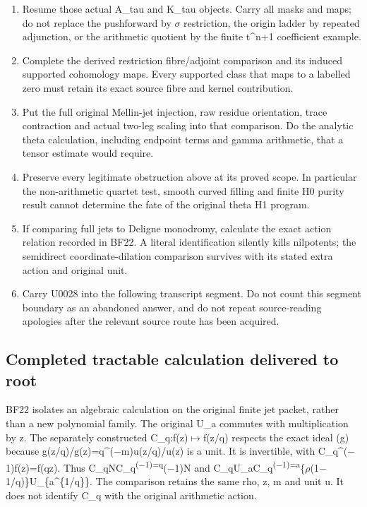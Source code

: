 \begin{enumerate}
\def\labelenumi{\arabic{enumi}.}
\tightlist
\item
  Resume those actual A\_tau and K\_tau objects. Carry all masks and
  maps; do not replace the pushforward by
  \allowbreak{}\ensuremath{σ}\allowbreak{} restriction, the origin
  ladder by repeated adjunction, or the arithmetic quotient by the
  finite t\^{}n+1 coefficient example.
\item
  Complete the derived restriction fibre/adjoint comparison and its
  induced supported cohomology maps. Every supported class that maps to
  a labelled zero must retain its exact source fibre and kernel
  contribution.
\item
  Put the full original Mellin-jet injection, raw residue orientation,
  trace contraction and actual two-leg scaling into that comparison. Do
  the analytic theta calculation, including endpoint terms and gamma
  arithmetic, that a tensor estimate would require.
\item
  Preserve every legitimate obstruction above at its proved scope. In
  particular the non-arithmetic quartet test, smooth curved filling and
  finite H0 purity result cannot determine the fate of the original
  theta H1 program.
\item
  If comparing full jets to Deligne monodromy, calculate the exact
  action relation recorded in BF22. A literal identification silently
  kills nilpotents; the semidirect coordinate-dilation comparison
  survives with its stated extra action and original unit.
\item
  Carry U0028 into the following transcript segment. Do not count this
  segment boundary as an abandoned answer, and do not repeat
  source-reading apologies after the relevant source route has been
  acquired.
\end{enumerate}

\subsection{Completed tractable calculation delivered to
root}\label{TranscriptLedgerStage:completed-tractable-calculation-delivered-to-root}

BF22 isolates an algebraic calculation on the original finite jet
packet, rather than a new polynomial family. The original U\_a commutes
with multiplication by z. The separately constructed
C\_q:f(z)\allowbreak{}\ensuremath{↦}\allowbreak{}f(z/q) respects the
exact ideal (g) because
g(z/q)/g(z)=q\textasciicircum{}(\allowbreak{}\ensuremath{−}\allowbreak{}m)u(z/q)/u(z)
is a unit. It is invertible, with
C\_q\textasciicircum{}(\allowbreak{}\ensuremath{−}\allowbreak{}1)f(z)=f(qz).
Thus
C\_qNC\_q\textsuperscript{(\allowbreak{}\ensuremath{−}\allowbreak{}1)=q}(\allowbreak{}\ensuremath{−}\allowbreak{}1)N
and
C\_qU\_aC\_q\textsuperscript{(\allowbreak{}\ensuremath{−}\allowbreak{}1)=a}\{\allowbreak{}\ensuremath{ρ}\allowbreak{}(1\allowbreak{}\ensuremath{−}\allowbreak{}1/q)\}U\_\{a\textasciicircum{}\{1/q\}\}.
The comparison retains the same rho, z, m and unit u. It does not
identify C\_q with the original arithmetic action.

